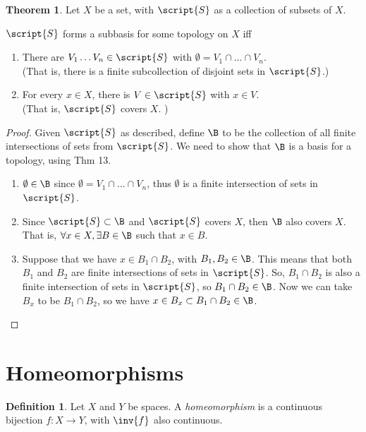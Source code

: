 \documentclass[a5paper]{article}
\theoremstyle{definition}%
\newtheorem{theorem}{Theorem}
\newtheorem*{definition*}{Definition}
\numberwithin{exercise}{section}
\theoremstyle{remark}%
\begin{document}
\begin{highlight}
\begin{theorem}
Let $X$ be a set, with $\script{S}$ as a collection of subsets of $X$. 

$\script{S}$ forms a subbasis for some topology on $X$ iff
\begin{enumerate}[label=(\alph*)]
\item There are $V_1 \ldots V_n \in \script{S}$ with $\emptyset=V_1\cap \ldots\cap V_n$. \\
(That is, there is a finite subcollection of disjoint sets in $\script{S}$.)
\item For every $x\in X$, there is $V\in\script{S}$ with $x\in V$. \\
(That is, $\script{S}$ covers $X$. )
\end{enumerate}
\end{theorem}
\end{highlight}

\begin{proof}
Given $\script{S}$ as described, define $\B$ to be the collection of all finite intersections of sets from $\script{S}$. We need to show that $\B$ is a basis for a topology, using Thm 13. 
\begin{enumerate}[label=(\alph*)]
\item $\emptyset\in\B$ since $\emptyset=V_1\cap\ldots\cap V_n$, thus $\emptyset$ is a finite intersection of sets in $\script{S}$. 
\item Since $\script{S}\subset\B$ and $\script{S}$ covers $X$, then $\B$ also covers $X$. That is, $\forall x\in X, \exists B\in\B$ such that $x\in B$. 
\item Suppose that we have $x\in B_1\cap B_2$, with $B_1, B_2\in \B$. This means that both $B_1$ and $B_2$ are finite intersections of sets in $\script{S}$. So, $B_1\cap B_2$ is also a finite intersection of sets in $\script{S}$, so $B_1\cap B_2\in\B$. Now we can take $B_x$ to be $B_1\cap B_2$, so we have $x\in B_x \subset B_1\cap B_2\in\B$. 
\end{enumerate}
\end{proof}

\section{Homeomorphisms}

\begin{highlight}
\begin{definition*}
Let $X$ and $Y$ be spaces. A \emph{homeomorphism} is a continuous bijection $f:X\to Y$, with $\inv{f}$ also continuous.
\end{definition*}
\end{highlight}
\end{document}
